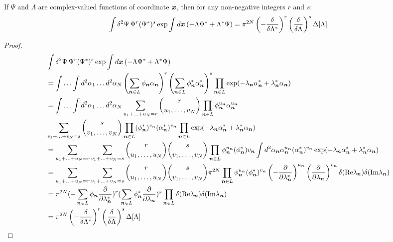 \begin{lemma}
\label{lmm:formalism:func-calculus:fourier-of-moments}
If $\Psi$ and $\Lambda$ are complex-valued functions of coordinate $\boldsymbol{x}$,
then for any non-negative integers $r$ and $s$:
\[
	\int \delta^2\Psi\, \Psi^r (\Psi^*)^s \exp
		\int d\boldsymbol{x} \left( -\Lambda \Psi^* + \Lambda^* \Psi \right)
	= \pi^{2N}
		\left( -\frac{\delta}{\delta \Lambda^*} \right)^r
		\left( \frac{\delta}{\delta \Lambda} \right)^s
		\Delta[\Lambda]
\]
\end{lemma}
\begin{proof}
\begin{equation*}
\begin{split}
	& \int \delta^2\Psi\, \Psi^r (\Psi^*)^s \exp
		\int d\boldsymbol{x} \left( -\Lambda \Psi^* + \Lambda^* \Psi \right) \\
	& = \int \ldots \int d^2\alpha_1 \ldots d^2\alpha_N
		\left( \sum_{\boldsymbol{n} \in L} \phi_{\boldsymbol{n}} \alpha_{\boldsymbol{n}} \right)^r
		\left( \sum_{\boldsymbol{n} \in L} \phi^*_{\boldsymbol{n}} \alpha_{\boldsymbol{n}}^* \right)^s
		\prod_{\boldsymbol{n} \in L} \exp(-\lambda_{\boldsymbol{n}} \alpha_{\boldsymbol{n}}^* + \lambda_{\boldsymbol{n}}^* \alpha_{\boldsymbol{n}}) \\
	& = \int \ldots \int d^2\alpha_1 \ldots d^2\alpha_N
		\sum_{u_1 + \ldots + u_N = r} \binom{r}{u_1, \ldots, u_N}
			\prod_{\boldsymbol{n} \in L} \phi_{\boldsymbol{n}}^{u_{\boldsymbol{n}}} \alpha_{\boldsymbol{n}}^{u_{\boldsymbol{n}}} \\
	&	\sum_{v_1 + \ldots + v_N = s} \binom{s}{v_1, \ldots, v_N}
			\prod_{\boldsymbol{n} \in L} (\phi_{\boldsymbol{n}}^*)^{v_{\boldsymbol{n}}} (\alpha_{\boldsymbol{n}}^*)^{v_{\boldsymbol{n}}}
		\prod_{\boldsymbol{n} \in L} \exp(-\lambda_{\boldsymbol{n}} \alpha_{\boldsymbol{n}}^* + \lambda_{\boldsymbol{n}}^* \alpha_{\boldsymbol{n}}) \\
	& = \sum_{u_1 + \ldots + u_N = r}
		\sum_{v_1 + \ldots + v_N = s}
		\binom{r}{u_1, \ldots, u_N}
		\binom{s}{v_1, \ldots, v_N}
		\prod_{\boldsymbol{n} \in L}
			\phi_{\boldsymbol{n}}^{u_{\boldsymbol{n}}} (\phi_{\boldsymbol{n}}^*){v_{\boldsymbol{n}}}
			\int d^2\alpha_{\boldsymbol{n}}
				\alpha_{\boldsymbol{n}}^{u_{\boldsymbol{n}}}
				(\alpha_{\boldsymbol{n}}^*)^{v_{\boldsymbol{n}}}
				\exp(-\lambda_{\boldsymbol{n}} \alpha_{\boldsymbol{n}}^* + \lambda_{\boldsymbol{n}}^* \alpha_{\boldsymbol{n}}) \\
	& = \sum_{u_1 + \ldots + u_N = r}
		\sum_{v_1 + \ldots + v_N = s}
		\binom{r}{u_1, \ldots, u_N}
		\binom{s}{v_1, \ldots, v_N}
		\pi^{2N}
		\prod_{\boldsymbol{n} \in L}
			\phi_{\boldsymbol{n}}^{u_{\boldsymbol{n}}} (\phi_{\boldsymbol{n}}^*)^{v_{\boldsymbol{n}}}
			\left( -\frac{\partial}{\partial \lambda_{\boldsymbol{n}}^*} \right)^{u_{\boldsymbol{n}}}
			\left( \frac{\partial}{\partial \lambda_{\boldsymbol{n}}} \right)^{v_{\boldsymbol{n}}}
			\delta(\mathrm{Re} \lambda_{\boldsymbol{n}}) \delta(\mathrm{Im} \lambda_{\boldsymbol{n}}) \\
	& = \pi^{2N}
		(-\sum_{\boldsymbol{n} \in L} \phi_{\boldsymbol{n}} \frac{\partial}{\partial \lambda_{\boldsymbol{n}}^*})^r
		(\sum_{\boldsymbol{n} \in L} \phi_{\boldsymbol{n}}^* \frac{\partial}{\partial \lambda_{\boldsymbol{n}}})^s
		\prod_{\boldsymbol{n} \in L} \delta(\mathrm{Re} \lambda_{\boldsymbol{n}}) \delta(\mathrm{Im} \lambda_{\boldsymbol{n}}) \\
	& = \pi^{2N}
		\left( -\frac{\delta}{\delta \Lambda^*} \right)^r
		\left( \frac{\delta}{\delta \Lambda} \right)^s
		\Delta[\Lambda]
	\qedhere
\end{split}
\end{equation*}
\end{proof}
